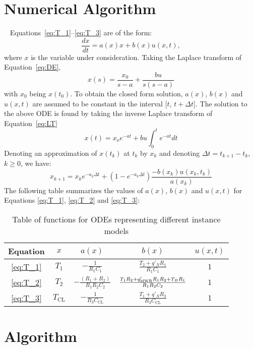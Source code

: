 \documentclass[letterpaper,12pt,baseclass=report]{cweb-hy}
\begin{document}
\section{Numerical Algorithm}
~\newline
Equations~\ref{eq:T_1}--\ref{eq:T_3} are of the form:
\begin{equation}
\frac{dx}{dt}=a(x)x+b(x)u(x,t) \label{eq:DE},
\end{equation}
where $x$ is the variable under consideration. Taking the Laplace
transform of Equation~\ref{eq:DE},
\begin{equation}
x(s)=\frac{x_0}{s-a}+\frac{bu}{s(s-a)} \label{eq:LT}
\end{equation}
with $x_0$ being $x(t_0)$.
To obtain the closed form solution, $a(x)$, $b(x)$ and $u(x,t)$ are assumed
to be constant in the interval [$t$, $t+\Delta t$].
The solution to the above ODE is found by taking the inverse Laplace transform
of
Equation~\ref{eq:LT}
\begin{equation}
x(t)=x_oe^{-at}+bu\int^t_0e^{-at}dt
\end{equation}
Denoting an approximation of $x(t_k)$ at $t_k$ by $x_{k}$ and denoting
$\Delta t = t_{k+1}-t_k$, $k\ge 0$, we have:
\begin{equation}
x_{k+1}=x_ke^{-a_k\Delta t} + (1-e^{-a_k\Delta t})%
\frac{-b(x_k)u(x_k,t_k)}{a(x_k)}
\label{eq:ODE}
\end{equation}
The following table summarizes the values of $a(x)$, $b(x)$ and $u(x,t)$ for
Equations
\ref{eq:T_1}, \ref{eq:T_2} and \ref{eq:T_3}:
\noindent
\begin{table}[H]
\centering
\begin{tabular}{c c c c c} \hline
Equation& $x$& $a(x)$& $b(x)$& $u(x,t)$ \\
\hline
\ref{eq:T_1}& $T_1$&$-\frac{1}{R_1 C_1 }$&$\frac{T_2+q'_{N}R_1}{ R_1 C_1 }$&$1$
\\
\hline
\ref{eq:T_2}&$T_2$&$-\frac{(R_1+ R_2) }{R_1 R_2 C_2 }$&$\frac{T_1 R_2+q'_{%
\mathrm{MWR}}R_1 R_2+
T_B R_1}{R_1 R_2 C_2 }$&$1$\\
\hline
\ref{eq:T_3}&$T_{\text{CL}}$&$-\frac{1}{R_3 C_{\text{CL}}}$&$\frac{T_1+q'_N
R_3}
{R_3C_{\text{CL}}}
$&$1$\\
\hline \end{tabular}
\caption{Table of functions for ODEs representing different instance models}
\end{table} \label{Tab:1}

\section{Algorithm}
\end{document}
